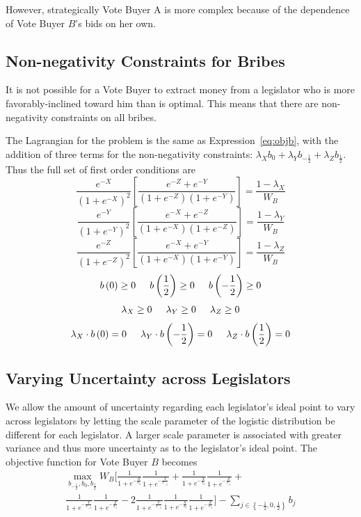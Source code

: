 \documentclass[12pt]{article}
\begin{document}
However, strategically Vote Buyer A is more complex because of the dependence of Vote Buyer $B$'s bids on her own.
				
\subsection{Non-negativity Constraints for Bribes}
\label{sec:nonneg}
It is not possible for a Vote Buyer to extract money from a legislator who is more favorably-inclined toward him than is optimal. This means that there are non-negativity constraints on all bribes. 

The Lagrangian for the problem is the same as Expression~\ref{eq:objb}, with the addition of three terms for the non-negativity constraints: $\lambda_X b_0 + \lambda_Y b_{-\frac{1}{2}} + \lambda_Z b_{\frac{1}{2}}$. Thus the full set of first order conditions are
\begin{equation}
    \frac{e^{-X}}{\left(1+e^{-X}\right)^2}\left[\frac{e^{-Z} + e^{-Y}}{\left(1+e^{-Z}\right)\left(1+e^{-Y}\right)} \right] = \frac{1 - \lambda_X}{W_B}
		\label{eq:focB}
\end{equation}
\begin{equation}
    \frac{e^{-Y}}{\left(1+e^{-Y}\right)^2}\left[\frac{e^{-X} + e^{-Z}}{\left(1+e^{-X}\right)\left(1+e^{-Z}\right)} \right] = \frac{1 - \lambda_Y}{W_B}
\end{equation}
\begin{equation}
    \frac{e^{-Z}}{\left(1+e^{-Z}\right)^2}\left[\frac{e^{-X} + e^{-Y}}{\left(1+e^{-X}\right)\left(1+e^{-Y}\right)} \right] = \frac{1 - \lambda_Z}{W_B}
\end{equation}
\[
  b\left(0\right) \geq0 \hskip.2in b\left(\frac{1}{2}\right) \geq0 \hskip.2in b\left(-\frac{1}{2}\right) \geq0 
\]
\[
  \lambda_X \geq0 \hskip.2in \lambda_Y \geq0 \hskip.2in \lambda_Z \geq0 
\]
\[
  \lambda_X \cdot b\left(0\right) = 0 \hskip.2in \lambda_Y \cdot b\left(-\frac{1}{2}\right) = 0 \hskip.2in \lambda_Z \cdot b\left(\frac{1}{2}\right) = 0 
\]



\subsection{Varying Uncertainty across Legislators}
\label{sec:uncert}
We allow the amount of uncertainty regarding each legislator's ideal point to vary across legislators by letting the scale parameter of the logistic distribution be different for each legislator. A larger scale parameter is associated with greater variance and thus more uncertainty as to the legislator's ideal point. The objective function for Vote Buyer $B$ becomes
 \begin{multline}
    \max_{b_{-\frac{1}{2}}, b_0, b_{\frac{1}{2}}} 
					W_B \biggl[ \frac{1}{1+e^{-\frac{X}{s_0}}} \frac{1}{1+e^{-\frac{Y}{s_{-.5}}}} +
					\frac{1}{1+e^{-\frac{X}{s_0}}} \frac{1}{1+e^{-\frac{Z}{s_{.5}}}} + \\
					\frac{1}{1+e^{-\frac{Y}{s_{-.5}}}} \frac{1}{1+e^{-\frac{Z}{s_{.5}}}} - 2	\frac{1}{1+e^{-\frac{Y}{s_{-.5}}}} \frac{1}{1+e^{-\frac{X}{s_0}}} \frac{1}{1+e^{-\frac{Z}{s_{.5}}}} \biggr] - \sum_{j\in \left\{-\frac{1}{2}, 0,\frac{1}{2}\right\}} b_j
	\end{multline}
\end{document}
